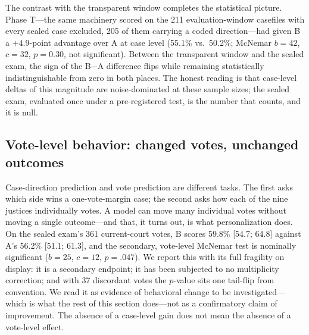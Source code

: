 The contrast with the transparent window completes the statistical
picture. Phase T---the same machinery scored on the 211
evaluation-window casefiles with every sealed case excluded, 205 of
them carrying a coded direction---had given B a $+4.9$-point advantage
over A at case level (55.1\% vs.\ 50.2\%; McNemar $b=42$, $c=32$,
$p=0.30$, not significant). Between the transparent window and the
sealed exam, the sign of the B$-$A difference flips while remaining
statistically indistinguishable from zero in both places. The honest
reading is that case-level deltas of this magnitude are noise-dominated
at these sample sizes; the sealed exam, evaluated once under a
pre-registered test, is the number that counts, and it is null.

\subsection{Vote-level behavior: changed votes, unchanged
outcomes}\label{sec:votes}

Case-direction prediction and vote prediction are different tasks. The
first asks which side wins a one-vote-margin case; the second asks how
each of the nine justices individually votes. A model can move many
individual votes without moving a single outcome---and that, it turns
out, is what personalization does. On the sealed exam's 361
current-court votes, B scores 59.8\% [54.7; 64.8] against A's 56.2\%
[51.1; 61.3], and the secondary, vote-level McNemar test is nominally
significant ($b=25$, $c=12$, $p=.047$). We report this with its full
fragility on display: it is a secondary endpoint; it has been
subjected to no multiplicity correction; and with 37 discordant votes
the $p$-value sits one tail-flip from convention. We read it as
evidence of behavioral change to be investigated---which is what the
rest of this section does---not as a confirmatory claim of
improvement. The absence of a case-level gain does not mean the
absence of a vote-level effect.

